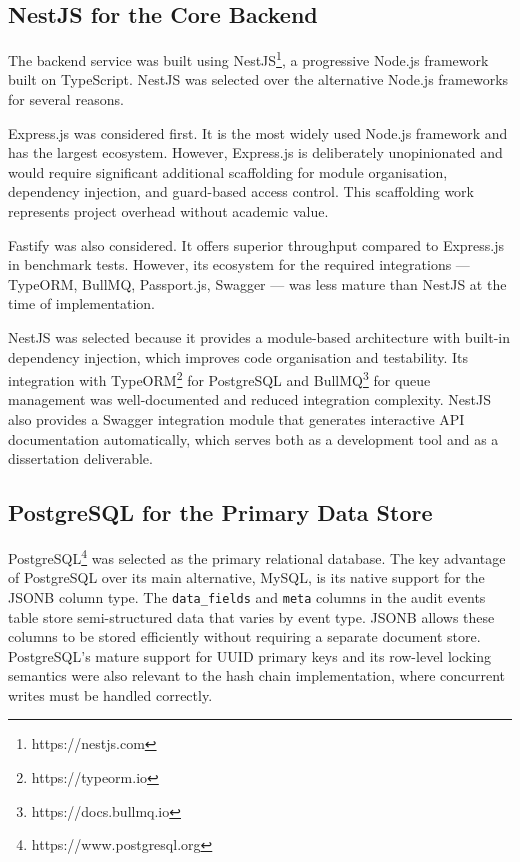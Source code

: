 \documentclass[a4paper,12pt,onecolumn]{report}
\begin{document}
\subsection{NestJS for the Core Backend}

The backend service was built using NestJS\footnote{\label{nestjs}https://nestjs.com}, a progressive Node.js framework built on TypeScript.
NestJS was selected over the alternative Node.js frameworks for several reasons.

Express.js was considered first.
It is the most widely used Node.js framework and has the largest ecosystem.
However, Express.js is deliberately unopinionated and would require significant additional scaffolding for module organisation, dependency injection, and guard-based access control.
This scaffolding work represents project overhead without academic value.

Fastify was also considered.
It offers superior throughput compared to Express.js in benchmark tests.
However, its ecosystem for the required integrations --- TypeORM, BullMQ, Passport.js, Swagger --- was less mature than NestJS at the time of implementation.

NestJS was selected because it provides a module-based architecture with built-in dependency injection, which improves code organisation and testability.
Its integration with TypeORM\footnote{\label{typeorm}https://typeorm.io} for PostgreSQL and BullMQ\footnote{\label{bullmq}https://docs.bullmq.io} for queue management was well-documented and reduced integration complexity.
NestJS also provides a Swagger integration module that generates interactive API documentation automatically, which serves both as a development tool and as a dissertation deliverable.

\subsection{PostgreSQL for the Primary Data Store}

PostgreSQL\footnote{\label{postgres}https://www.postgresql.org} was selected as the primary relational database.
The key advantage of PostgreSQL over its main alternative, MySQL, is its native support for the JSONB column type.
The \texttt{data\_fields} and \texttt{meta} columns in the audit events table store semi-structured data that varies by event type.
JSONB allows these columns to be stored efficiently without requiring a separate document store.
PostgreSQL's mature support for UUID primary keys and its row-level locking semantics were also relevant to the hash chain implementation, where concurrent writes must be handled correctly.
\end{document}
